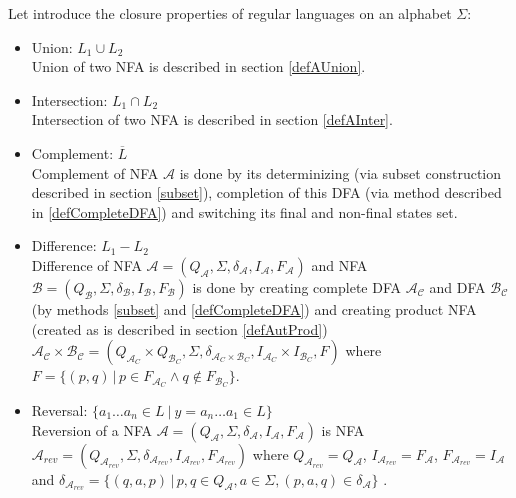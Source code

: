 		Let introduce the closure properties of regular languages on an alphabet $\Sigma$:
		\begin{itemize}
			\item Union:  $L_1 \cup L_2$\\%
      Union of two NFA is described in section \ref{defAUnion}.
			\item Intersection:  $L_1 \cap L_2$\\%
      Intersection of two NFA is described in section \ref{defAInter}.
			\item Complement: $\overline{L}$\\%
      Complement of NFA $\mathcal{A}$ is done by its determinizing (via subset construction described in section \ref{subset}), completion of this DFA (via
      method described in \ref{defCompleteDFA}) and switching its final and non-final states set.

      \item Difference: $L_1-L_2$\\%
      Difference of NFA $\mathcal{A}=(Q_\mathcal{A},\Sigma,\delta_\mathcal{A},I_\mathcal{A},F_\mathcal{A})$ 
      and NFA $\mathcal{B}=(Q_\mathcal{B},\Sigma,\delta_\mathcal{B},I_\mathcal{B},F_\mathcal{B})$ is done by creating
      complete DFA $\mathcal{A_C}$ and DFA $\mathcal{B_C}$ (by methods \ref{subset} and \ref{defCompleteDFA}) 
      and creating product NFA (created as is described in section 
      \ref{defAutProd})
      $\mathcal{A_C} \times \mathcal{B_C}=
          (Q_{\mathcal{A}_C}\times Q_{\mathcal{B}_C},\Sigma,\delta_{{\mathcal{A}_C}\times{\mathcal{B}_C}},I_{\mathcal{A}_C}\times I_{\mathcal{B}_C},F)$
      where $F=\{(p,q)\,|\, p\in F_{\mathcal{A}_C} \wedge q\not\in F_{\mathcal{B}_C}\}$.

			\item Reversal: $\{a_1\dots a_n \in L \ |\ y=a_n\dots a_1 \in L\}$\\
      Reversion of a NFA $\mathcal{A}=(Q_\mathcal{A},\Sigma,\delta_\mathcal{A},I_\mathcal{A},F_\mathcal{A})$ is
      NFA $\mathcal{A}_{rev}=(Q_{\mathcal{A}_{rev}},\Sigma,\delta_{\mathcal{A}_{rev}},I_{\mathcal{A}_{rev}},F_{\mathcal{A}_{rev}})$ 
      where $Q_{\mathcal{A}_{rev}} = Q_\mathcal{A}$, 
      $I_{\mathcal{A}_{rev}} = F_\mathcal{A}$, $F_{\mathcal{A}_{rev}} = I_\mathcal{A}$ and 
      $\delta_{\mathcal{A}_{rev}}=\{(q,a,p)\,|\,p,q \in Q_\mathcal{A}, a \in \Sigma,(p,a,q)\in\delta_{\mathcal{A}}\}$ .


\end{itemize}

